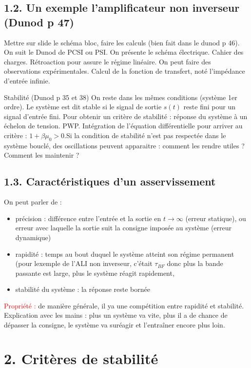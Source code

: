 \documentclass[french, a4paper, 10pt, twocolumn, landscape]{article}
\begin{document}
\subsection*{1.2. Un exemple l'amplificateur non inverseur (Dunod p 47)}

Mettre sur slide le schéma bloc, faire les calculs (bien fait dans le dunod p 46). On suit le Dunod de PCSI ou PSI. On présente le schéma électrique. Cahier des charges. Rétroaction pour assure le régime linéaire. On peut faire des observations expérimentales. Calcul de la fonction de transfert, noté l'impédance d'entrée infinie.\medskip

Stabilité (Dunod p 35 et 38)
On reste dans les mêmes conditions (système 1er ordre). Le système est dit stable si le signal de sortie $s(t)$ reste fini pour un signal d’entrée fini. Pour obtenir un critère de stabilité : réponse du système à un échelon de tension. PWP. Intégration de l’équation différentielle pour arriver au critère : $1 + \beta \mu_0 > 0$.Si la condition de stabilité n’est pas respectée dans le système bouclé, des oscillations peuvent apparaitre : comment les rendre utiles ? Comment les maintenir ? 

\subsection*{1.3. Caractéristiques d'un asservissement}

On peut parler de :
\begin{itemize}
    \item précision : différence entre l'entrée et la sortie en $t\rightarrow\infty$ (erreur statique), ou erreur avec laquelle la sortie suit la consigne imposée au système (erreur dynamique)
    \item rapidité : temps au bout duquel le système atteint son régime permanent (pour lexemple de l'ALI non inverseur, c'était $\tau_{BF}$ donc plus la bande passante est large, plus le système réagit rapidement,
    \item stabilité du système : la réponse reste bornée
\end{itemize}
\textcolor{red}{Propriété :} de manière générale, il ya une compétition entre rapidité et stabilité. Explication avec les mains : plus un système va vite, plus il a de chance de dépasser la consigne, le système va suréagir et l'entraîner encore plus loin.

\section*{2. Critères de stabilité}
\end{document}
